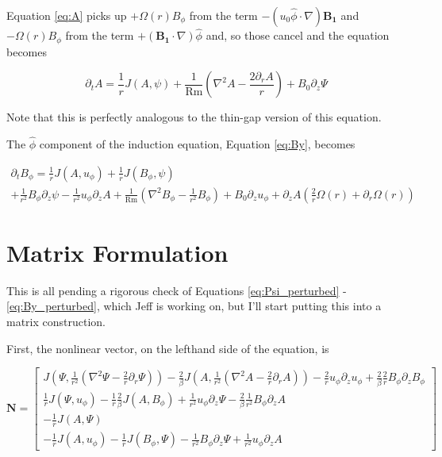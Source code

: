 \documentclass{paper}
\newcommand{\beq}{\begin{equation}}
\newcommand{\eeq}{\end{equation}}
\newcommand{\uphi}{\ensuremath{u_\phi}}
\newcommand\reym{\mathrm{Rm}}
\begin{document}
Equation \ref{eq:A} picks up $+\Omega(r) B_\phi$ from the term $- ({u_0}\hat{\phi} \cdot \nabla)\mathbf{B_1}$ and $-\Omega(r) B_\phi$ from the term $+(\mathbf{B_1} \cdot \nabla) \hat{\phi}$ and, so those cancel and the equation becomes

\beq
 \label{eq:A_perturbed}
\partial_t A = \frac{1}{r} J(A, \psi) + \frac{1}{\reym} \left( \nabla^2 A - \frac{2 \partial_r A}{r} \right) + B_0 \partial_z \Psi
\eeq

Note that this is perfectly analogous to the thin-gap version of this equation.

The $\hat{\phi}$ component of the induction equation, Equation \ref{eq:By}, becomes

\begin{multline}
  \label{eq:By_perturbed}
\partial_t B_\phi = \frac{1}{r} J(A, \uphi) + \frac{1}{r} J(B_\phi, \psi)\\
+ \frac{1}{r^2} B_\phi \partial_z \psi - \frac{1}{r^2} \uphi \partial_z A + \frac{1}{\reym} \left(\nabla^2 B_\phi - \frac{1}{r^2} B_\phi \right) + B_0 \partial_z u_\phi + \partial_z A \left( \frac{2}{r}\Omega(r) + \partial_r \Omega(r) \right) %
\end{multline}


\section{Matrix Formulation}

This is all pending a rigorous check of Equations \ref{eq:Psi_perturbed} - \ref{eq:By_perturbed}, which Jeff is working on, but I'll start putting this into a matrix construction.

First, the nonlinear vector, on the lefthand side of the equation, is

\beq\label{eq:nonlinearvector}
\mathbf{N} = \left[\begin{matrix}
J\left(\Psi, \frac{1}{r^2} \left(\nabla^2 \Psi - \frac{2}{r}\partial_r \Psi \right) \right) - \frac{2}{\beta} J \left(A, \frac{1}{r^2} \left( \nabla^2 A - \frac{2}{r} \partial_r A\right)\right) - \frac{2}{r} u_\phi \partial_z u_\phi + \frac{2}{\beta} \frac{2}{r} B_\phi \partial_z B_\phi \\
\frac{1}{r} J \left(\Psi, u_\phi\right) - \frac{1}{r} \frac{2}{\beta} J \left(A, B_\phi\right) + \frac{1}{r^2} u_\phi \partial_z \Psi - \frac{2}{\beta} \frac{1}{r^2} B_\phi \partial_z A \\
-\frac{1}{r} J \left(A, \Psi\right)\\
-\frac{1}{r} J \left(A, u_\phi\right) - \frac{1}{r} J \left(B_\phi, \Psi\right) - \frac{1}{r^2} B_\phi \partial_z \Psi + \frac{1}{r^2} u_\phi \partial_z A
\end{matrix}\right] 
\eeq
\end{document}
